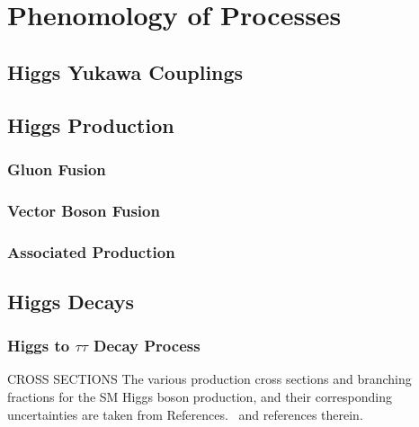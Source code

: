 \chapter{Phenomology of Processes}

\section{Higgs Yukawa Couplings}

\section{Higgs Production}

\subsection{Gluon Fusion}

\subsection{Vector Boson Fusion}

\subsection{Associated Production}

\section{Higgs Decays}

\subsection{Higgs to $\tau\tau$ Decay Process}

CROSS SECTIONS
The various production cross sections and branching fractions for the SM Higgs 
boson production, and their corresponding uncertainties are taken from 
References.~\cite{deFlorian:2016spz,Denner:2011mq,Ball:2011mu} and references therein.
